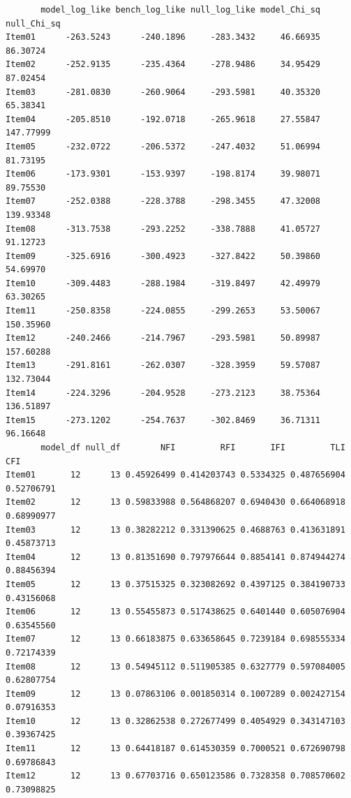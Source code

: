 \documentclass[
  a4paper,
]{ltjsbook}
\newenvironment{Shaded}{\begin{snugshade}}{\end{snugshade}}
\newcommand{\NormalTok}[1]{\textcolor[rgb]{0.00,0.23,0.31}{#1}}
\newcommand{\SpecialCharTok}[1]{\textcolor[rgb]{0.37,0.37,0.37}{#1}}
\begin{document}
\begin{Shaded}
\end{Shaded}

\begin{verbatim}
       model_log_like bench_log_like null_log_like model_Chi_sq null_Chi_sq
Item01      -263.5243      -240.1896     -283.3432     46.66935    86.30724
Item02      -252.9135      -235.4364     -278.9486     34.95429    87.02454
Item03      -281.0830      -260.9064     -293.5981     40.35320    65.38341
Item04      -205.8510      -192.0718     -265.9618     27.55847   147.77999
Item05      -232.0722      -206.5372     -247.4032     51.06994    81.73195
Item06      -173.9301      -153.9397     -198.8174     39.98071    89.75530
Item07      -252.0388      -228.3788     -298.3455     47.32008   139.93348
Item08      -313.7538      -293.2252     -338.7888     41.05727    91.12723
Item09      -325.6916      -300.4923     -327.8422     50.39860    54.69970
Item10      -309.4483      -288.1984     -319.8497     42.49979    63.30265
Item11      -250.8358      -224.0855     -299.2653     53.50067   150.35960
Item12      -240.2466      -214.7967     -293.5981     50.89987   157.60288
Item13      -291.8161      -262.0307     -328.3959     59.57087   132.73044
Item14      -224.3296      -204.9528     -273.2123     38.75364   136.51897
Item15      -273.1202      -254.7637     -302.8469     36.71311    96.16648
       model_df null_df        NFI         RFI       IFI         TLI        CFI
Item01       12      13 0.45926499 0.414203743 0.5334325 0.487656904 0.52706791
Item02       12      13 0.59833988 0.564868207 0.6940430 0.664068918 0.68990977
Item03       12      13 0.38282212 0.331390625 0.4688763 0.413631891 0.45873713
Item04       12      13 0.81351690 0.797976644 0.8854141 0.874944274 0.88456394
Item05       12      13 0.37515325 0.323082692 0.4397125 0.384190733 0.43156068
Item06       12      13 0.55455873 0.517438625 0.6401440 0.605076904 0.63545560
Item07       12      13 0.66183875 0.633658645 0.7239184 0.698555334 0.72174339
Item08       12      13 0.54945112 0.511905385 0.6327779 0.597084005 0.62807754
Item09       12      13 0.07863106 0.001850314 0.1007289 0.002427154 0.07916353
Item10       12      13 0.32862538 0.272677499 0.4054929 0.343147103 0.39367425
Item11       12      13 0.64418187 0.614530359 0.7000521 0.672690798 0.69786843
Item12       12      13 0.67703716 0.650123586 0.7328358 0.708570602 0.73098825

\end{verbatim}
\end{document}
